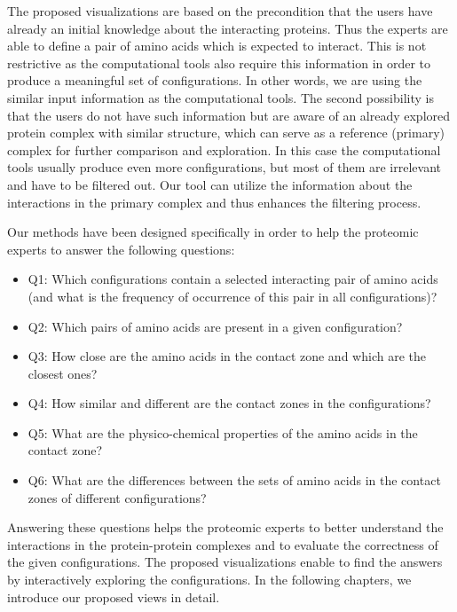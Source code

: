 \documentclass{bmcart}
\begin{document}
The proposed visualizations are based on the precondition that the users have already an initial knowledge about the interacting proteins.
Thus the experts are able to define a pair of amino acids which is expected to interact.
This is not restrictive as the computational tools also require this information in order to produce a meaningful set of configurations. 
In other words, we are using the similar input information as the computational tools.
The second possibility is that the users do not have such information but are aware of an already explored protein complex with similar structure, which can serve as a reference (primary) complex for further comparison and exploration. 
In this case the computational tools usually produce even more configurations, but most of them are irrelevant and have to be filtered out. 
Our tool can utilize the information about the interactions in the primary complex and thus enhances the filtering process.

Our methods have been designed specifically in order to help the proteomic experts to answer the following questions:
\begin{itemize}
\item Q1: Which configurations contain a selected interacting pair of amino acids (and what is the frequency of occurrence of this pair in all configurations)?
\item Q2: Which pairs of amino acids are present in a given configuration?
\item Q3: How close are the amino acids in the contact zone and which are the closest ones?
\item Q4: How similar and different are the contact zones in the configurations?
\item Q5: What are the physico-chemical properties of the amino acids in the contact zone?
\item Q6: What are the differences between the sets of amino acids in the contact zones of different configurations?
\end{itemize}

Answering these questions helps the proteomic experts to better understand the interactions in the protein-protein complexes and to evaluate the correctness of the given configurations.
The proposed visualizations enable to find the answers by interactively exploring the configurations.
In the following chapters, we introduce our proposed views in detail.
\end{document}
